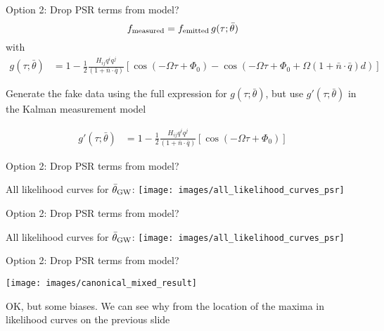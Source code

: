 \documentclass[10pt]{beamer}
\begin{document}
\begin{frame}{Option 2: Drop PSR terms from model?}
	 \begin{equation}
		f_{\rm measured} = f_{\rm emitted} \, g(\tau; \bar{\theta})
		\label{eq:measureent}
	\end{equation}
	with
	\begin{align}
		g(\tau; \bar{\theta}) 
		& = 1 - \frac{1}{2} \frac{ H_{ij}q^i q^j }{(1 + \bar{n}\cdot \bar{q}) } \left[ \cos(-\Omega \tau +\Phi_0) - \cos(-\Omega \tau +\Phi_0 + \Omega (1 + \bar{n}\cdot \bar{q})  d) \right]
	\end{align}

Generate the fake data using the full expression for $g(\tau; \bar{\theta})$, but use $g'(\tau; \bar{\theta})$ in the Kalman measurement model
	
		\begin{align}
		g'(\tau; \bar{\theta}) 
		& = 1 - \frac{1}{2} \frac{ H_{ij}q^i q^j }{(1 + \bar{n}\cdot \bar{q}) } \left[ \cos(-\Omega \tau +\Phi_0) \right]
	\end{align}
\end{frame}


\begin{frame}{Option 2: Drop PSR terms from model?}
	
		All likelihood curves for $\bar{\theta}_{\rm GW}$:
		\texttt{[image: images/all\_likelihood\_curves\_psr]}

\end{frame}


\begin{frame}{Option 2: Drop PSR terms from model?}
	
	All likelihood curves for $\bar{\theta}_{\rm GW}$:
	\texttt{[image: images/all\_likelihood\_curves\_psr]}
	
\end{frame}

\begin{frame}{Option 2: Drop PSR terms from model?}
	
	
	\texttt{[image: images/canonical\_mixed\_result]}
	
	OK, but some biases. We can see why from the location of the maxima in likelihood curves on the previous slide
\end{frame}





	
\end{document}
